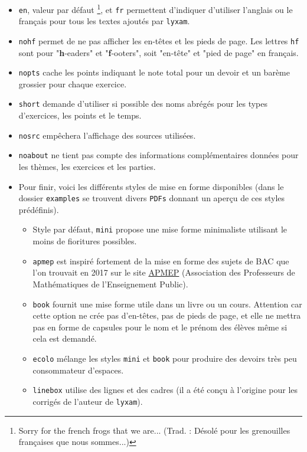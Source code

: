 \documentclass[12pt,a4paper]{scrartcl}
\theoremstyle{definition}
\begin{document}
\begin{itemize}
	\item \verb+en+, valeur par défaut
	\footnote{
		Sorry for the french frogs that we are... (Trad. : Désolé pour les grenouilles françaises que nous sommes...)
	}, et \verb+fr+ permettent d'indiquer d'utiliser l'anglais ou le français pour tous les textes ajoutés par \verb+lyxam+.

	\item \verb+nohf+ permet de ne pas afficher les en-têtes et les pieds de page.
	Les lettres \verb+hf+ sont pour "\textbf{h}-eaders" et "\textbf{f}-ooters", soit "en-tête" et "pied de page" en français.

	\item \verb+nopts+ cache les points indiquant le note total pour un devoir et un barème grossier pour chaque exercice.

	\item \verb+short+ demande d'utiliser si possible des noms abrégés pour les types d'exercices, les points et le temps.

	\item \verb+nosrc+ empêchera l'affichage des sources utilisées.

	\item \verb+noabout+ ne tient pas compte des informations complémentaires données pour les thèmes, les exercices et les parties.

	\item Pour finir, voici les différents styles de mise en forme disponibles (dans le dossier \verb+examples+ se trouvent divers \verb+PDFs+ donnant un aperçu de ces styles prédéfinis).
	\begin{itemize}[label={\small\textbullet}]
        \item Style par défaut, \verb+mini+ propose une mise forme minimaliste utilisant le moins de fioritures possibles.
        
        \item \verb+apmep+ est inspiré fortement de la mise en forme des sujets de BAC que l'on trouvait en 2017 sur le site \href{https://www.apmep.fr}{APMEP} (Association des Professeurs de Mathématiques de l'Enseignement Public).
        
        \item \verb+book+ fournit une mise forme utile dans un livre ou un cours. Attention car cette option ne crée pas d'en-têtes, pas de pieds de page, et elle ne mettra pas en forme de capsules pour le nom et le prénom des élèves même si cela est demandé.
        
        \item \verb+ecolo+ mélange les styles \verb+mini+ et \verb+book+ pour produire des devoirs très peu consommateur d'espaces.
        
        \item \verb+linebox+ utilise des lignes et des cadres (il a été conçu à l'origine pour les corrigés de l'auteur de \verb+lyxam+).
    \end{itemize}
\end{itemize}
\end{document}
